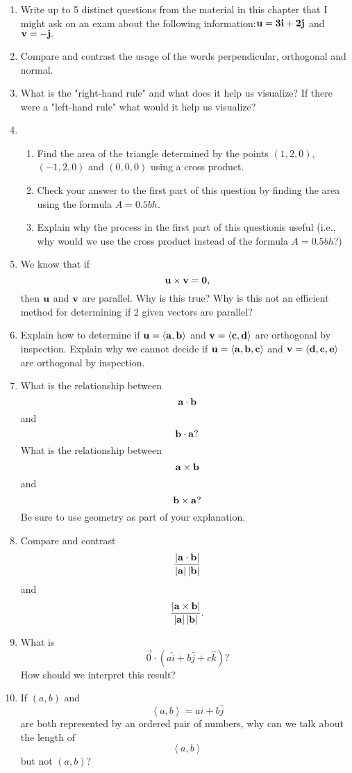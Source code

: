 \begin{enumerate}
 \item Write up to 5 distinct questions from the material in this chapter that I might ask on an exam about the following information:$\bf{u} = 3{\bf{i}} + 2{\bf{j}}$ and $\bf{v}= -{\bf{j}}.$
 \item Compare and contrast the usage of the words perpendicular, orthogonal and normal.
 \item What is the "right-hand rule" and what does it help us visualize?  If there were a "left-hand rule" what would it help us visualize?
 \item 
 \begin{enumerate} 
 \item Find the area of the triangle determined by the points $(1, 2, 0)$, $(-1, 2, 0)$ and $(0, 0, 0)$ using a cross product. 
 \item Check your answer to the first part of this question by finding the area using the formula $A = 0.5 bh$. 
 \item Explain why the process in the first part of this questionis useful (i.e., why would we use the cross product instead of the formula $A = 0.5 bh$?)
 \end{enumerate}
 \item We know that if $$\bf{u} \times \bf{v} = 0,$$ then $\bf{u}$ and $\bf{v}$ are parallel.  Why is this true?  Why is this not an efficient method for determining if 2 given vectors are parallel?
 \item Explain how to determine if $\bf{u} = \left\langle  a, b \right\rangle $ and $\bf{v} = \left\langle c, d\right\rangle $ are orthogonal by inspection.  Explain why we cannot decide if $\bf{u} = \left\langle a, b, c\right\rangle$ and $\bf{v} = \left\langle d, c, e\right\rangle$ are orthogonal by inspection.
 \item What is the relationship between $${\bf{a}} \cdot {\bf{b}}$$ and $${\bf{b}} \cdot {\bf{a}}?$$  What is the relationship between $${\bf{a}} \times {\bf{b}}$$ and $${\bf{b}} \times {\bf{a}}?$$  Be sure to use geometry as part of your explanation.
 \item Compare and contrast $${{\left| {{\bf{a}} \cdot {\bf{b}}} \right|} \over {\left| {\bf{a}} \right|\left| {\bf{b}} \right|}}$$and $${{\left| {{\bf{a}} \times {\bf{b}}} \right|} \over {\left| {\bf{a}} \right|\left| {\bf{b}} \right|}}.$$
 \item What is $$\vec 0 \cdot \left( {a\hat i + b\hat j + c\hat k} \right)?$$  How should we interpret this result?  
 \item If $(a, b)$ and $$\left\langle {a,b} \right\rangle  = a\hat i + b\hat j$$ are both represented by an ordered pair of numbers, why can we talk about the length of $$\left\langle {a,b} \right\rangle $$ but not $(a, b)$?

\end{enumerate}

